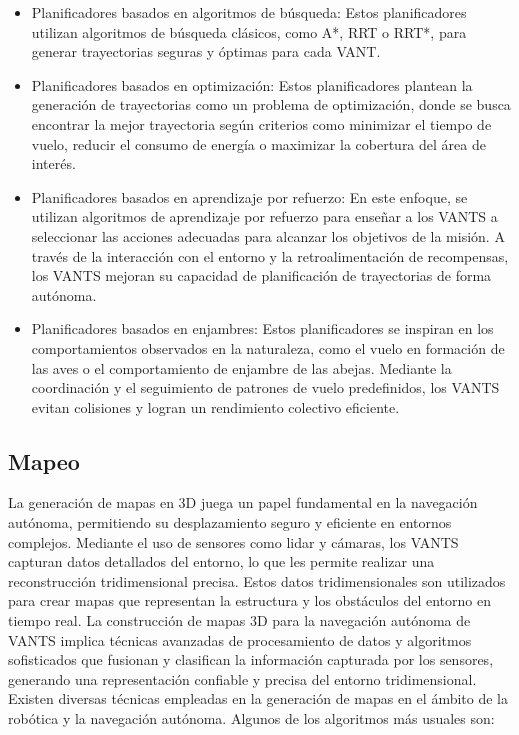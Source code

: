 \documentclass[sigconf]{acmart}
\begin{document}
\begin{itemize}
  
\item Planificadores basados en algoritmos de búsqueda: Estos planificadores utilizan algoritmos de búsqueda clásicos, como A*, RRT o RRT*, para generar trayectorias seguras y óptimas para cada VANT.

\item Planificadores basados en optimización: Estos planificadores plantean la generación de trayectorias como un problema de optimización, donde se busca encontrar la mejor trayectoria según criterios como minimizar el tiempo de vuelo, reducir el consumo de energía o maximizar la cobertura del área de interés.
  
\item Planificadores basados en aprendizaje por refuerzo: En este enfoque, se utilizan algoritmos de aprendizaje por refuerzo para enseñar a los VANTS a seleccionar las acciones adecuadas para alcanzar los objetivos de la misión. A través de la interacción con el entorno y la retroalimentación de recompensas, los VANTS mejoran su capacidad de planificación de trayectorias de forma autónoma.

\item Planificadores basados en enjambres: Estos planificadores se inspiran en los comportamientos observados en la naturaleza, como el vuelo en formación de las aves o el comportamiento de enjambre de las abejas. Mediante la coordinación y el seguimiento de patrones de vuelo predefinidos, los VANTS evitan colisiones y logran un rendimiento colectivo eficiente.
  
\end{itemize}

\subsection*{Mapeo}

La generación de mapas en 3D juega un papel fundamental en la navegación autónoma, permitiendo su desplazamiento seguro y eficiente en entornos complejos. Mediante el uso de sensores como lidar y cámaras, los VANTS capturan datos detallados del entorno, lo que les permite realizar una reconstrucción tridimensional precisa. Estos datos tridimensionales son utilizados para crear mapas que representan la estructura y los obstáculos del entorno en tiempo real. La construcción de mapas 3D para la navegación autónoma de VANTS implica técnicas avanzadas de procesamiento de datos y algoritmos sofisticados que fusionan y clasifican la información capturada por los sensores, generando una representación confiable y precisa del entorno tridimensional.\\
Existen diversas técnicas empleadas en la generación de mapas en el ámbito de la robótica y la navegación autónoma. Algunos de los algoritmos más usuales son:
\end{document}
